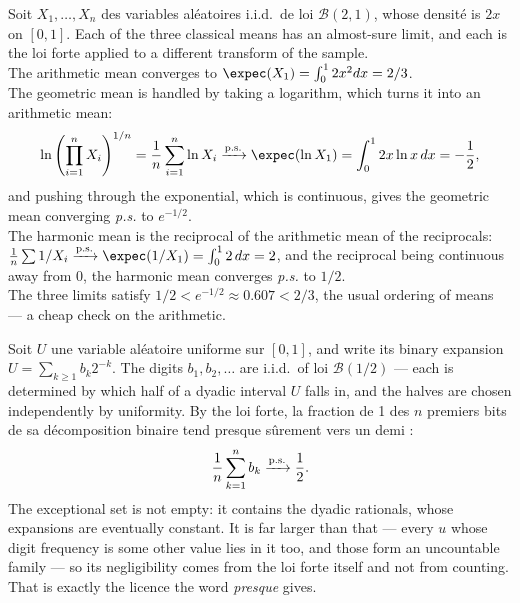 \begin{example}
  Soit $X_{1}, \dots, X_{n}$ des variables aléatoires i.i.d.\ de loi
  $\mathcal{B}(2,1)$, whose densité is $2x$ on $[0,1]$. Each of the three
  classical means has an almost-sure limit, and each is the loi forte applied to
  a different transform of the sample.\\
  The arithmetic mean converges to $\expec(X_{1}) = \int_{0}^{1} 2x^{2}dx =
  2/3$.\\
  The geometric mean is handled by taking a logarithm, which turns it into an
  arithmetic mean:
  \[
    \ln\left(\prod_{i=1}^{n} X_{i}\right)^{1/n}
      = \frac{1}{n}\sum_{i=1}^{n} \ln X_{i} \cvas \expec(\ln X_{1})
      = \int_{0}^{1} 2x \ln x \, dx = -\frac{1}{2} ,
  \]
  and pushing through the exponential, which is continuous, gives the geometric
  mean converging \textit{p.s.} to $e^{-1/2}$.\\
  The harmonic mean is the reciprocal of the arithmetic mean of the reciprocals:
  $\frac{1}{n}\sum 1/X_{i} \cvas \expec(1/X_{1}) = \int_{0}^{1} 2 \, dx = 2$, and
  the reciprocal being continuous away from $0$, the harmonic mean converges
  \textit{p.s.} to $1/2$.\\
  The three limits satisfy $1/2 < e^{-1/2} \approx 0.607 < 2/3$, the usual
  ordering of means --- a cheap check on the arithmetic.
\end{example}

\begin{example}
  Soit $U$ une variable aléatoire uniforme sur $[0,1]$, and write its binary
  expansion $U = \sum_{k \geq 1} b_{k} 2^{-k}$. The digits
  $b_{1}, b_{2}, \dots$ are i.i.d.\ of loi $\mathcal{B}(1/2)$ --- each is
  determined by which half of a dyadic interval $U$ falls in, and the halves are
  chosen independently by uniformity. By the loi forte, la fraction de 1 des $n$
  premiers bits de sa décomposition binaire tend presque sûrement vers un
  demi :
  \[
    \frac{1}{n} \sum_{k=1}^{n} b_{k} \xrightarrow{\text{p.s.}} \frac{1}{2} .
  \]
  The exceptional set is not empty: it contains the dyadic rationals, whose
  expansions are eventually constant. It is far larger than that --- every $u$
  whose digit frequency is some other value lies in it too, and those form an
  uncountable family --- so its negligibility comes from the loi forte itself
  and not from counting. That is exactly the licence the word \textit{presque}
  gives.
\end{example}

